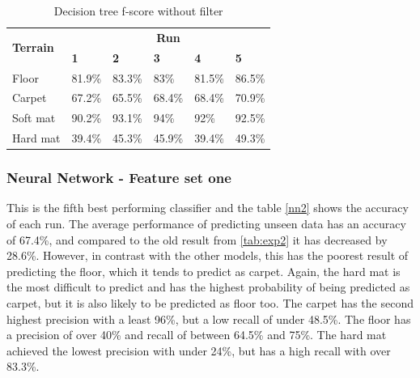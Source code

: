 \documentclass[USenglish]{ifimaster}  %
\begin{document}
	\begin{table}[h]
		\centering
		\begin{tabular}{@{}llllll@{}}
			\toprule
			\multirow{2}{*}{\textbf{Terrain}} & \multicolumn{5}{c}{\textbf{Run}} \\ \cmidrule(l){2-6} 
			& \multicolumn{1}{l|}{\textbf{1}} & \multicolumn{1}{l|}{\textbf{2}} & \multicolumn{1}{l|}{\textbf{3}} & \multicolumn{1}{l|}{\textbf{4}} & \textbf{5} \\ \midrule
			\multicolumn{1}{l|}{Floor} & \multicolumn{1}{l|}{81.9\%} & \multicolumn{1}{l|}{83.3\%} & \multicolumn{1}{l|}{83\%} & \multicolumn{1}{l|}{81.5\%} & 86.5\% \\ \midrule
			\multicolumn{1}{l|}{Carpet} & \multicolumn{1}{l|}{67.2\%} & \multicolumn{1}{l|}{65.5\%} & \multicolumn{1}{l|}{68.4\%} & \multicolumn{1}{l|}{68.4\%} & 70.9\% \\ \midrule
			\multicolumn{1}{l|}{Soft mat} & \multicolumn{1}{l|}{90.2\%} & \multicolumn{1}{l|}{93.1\%} & \multicolumn{1}{l|}{94\%} & \multicolumn{1}{l|}{92\%} & 92.5\% \\ \midrule
			\multicolumn{1}{l|}{Hard mat} & \multicolumn{1}{l|}{39.4\%} & \multicolumn{1}{l|}{45.3\%} & \multicolumn{1}{l|}{45.9\%} & \multicolumn{1}{l|}{39.4\%} & 49.3\% \\ \bottomrule
		\end{tabular}
		\caption{Decision tree f-score without filter}
		\label{dtfscore}
	\end{table}
	\FloatBarrier
	\newpage
	
\subsubsection{Neural Network - Feature set one}
This is the fifth best performing classifier and the table \ref{nn2} shows the accuracy of each run. The average performance of predicting unseen data has an accuracy of 67.4\%, and compared to the old result from \ref{tab:exp2} it has decreased by 28.6\%. However, in contrast with the other models, this has the poorest result of predicting the floor, which it tends to predict as carpet. Again, the hard mat is the most difficult to predict and has the highest probability of being predicted as carpet, but it is also likely to be predicted as floor too. The carpet has the second highest precision with a least 96\%, but a low recall of under 48.5\%. The floor has a precision of over 40\% and recall of between 64.5\% and 75\%. The hard mat achieved the lowest precision with under 24\%, but has a high recall with over 83.3\%.
		
\end{document}

